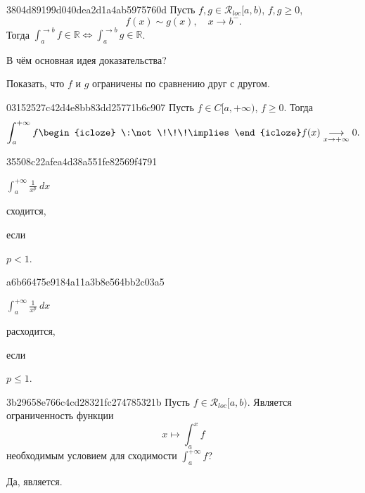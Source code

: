 \begin{note}{3804d89199d040dea2d1a4ab5975760d}
    Пусть \({ f, g \in \mathcal R_{loc}[a, b) }\),\: \({ f, g \geqslant 0 }\),
    \[
        f(x) \sim g(x), \quad x \to b^{-}.
    \]
    Тогда \({ \int_{a}^{\to b} f \in \mathbb R \iff \int_{a}^{\to b} g \in \mathbb R }\).

    В чём основная идея доказательства?

    \begin{cloze}{1}
        Показать, что \({ f }\) и \({ g }\) ограничены по сравнению друг с другом.
    \end{cloze}
\end{note}

\begin{note}{03152527c42d4e8bb83dd25771b6c907}
    Пусть \({ f \in C[a, +\infty) }\),\: \({ f \geqslant 0 }\).
    Тогда
    \[
        \int_{a}^{+\infty} f
        \begin{icloze}{1}\:\not\!\!\!\implies\end{icloze}
        f(x) \underset{x \to +\infty}\longrightarrow 0.
    \]
\end{note}

\begin{note}{35508c22afea4d38a551fe82569f4791}
    \begin{center}
        \({ \displaystyle \int_{a}^{+\infty} \frac{1}{x^{p}}\: dx }\) \begin{icloze}{2}сходится,\end{icloze} если \begin{icloze}{1}\({ p < 1 }\).\end{icloze}
    \end{center}
\end{note}

\begin{note}{a6b66475e9184a11a3b8e564bb2c03a5}
    \begin{center}
        \({ \displaystyle \int_{a}^{+\infty} \frac{1}{x^{p}}\: dx }\) \begin{icloze}{2}расходится,\end{icloze} если \begin{icloze}{1}\({ p \leqslant 1 }\).\end{icloze}
    \end{center}
\end{note}

\begin{note}{3b29658e766c4cd28321fc274785321b}
    Пусть \({ f \in \mathcal R_{loc}[a, b) }\).
    Является ограниченность функции
    \[
        x \mapsto \int_{a}^{x} f
    \]
    необходимым условием для сходимости \({ \int_{a}^{+\infty} f }\)?

    \begin{cloze}{1}
        Да, является.
    \end{cloze}
\end{note}


